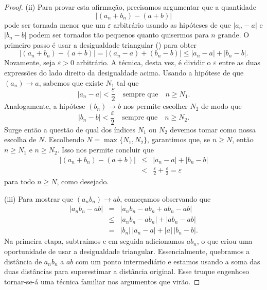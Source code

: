 \begin{proof}
(ii) Para provar esta afirmação, precisamos argumentar que a quantidade
\[
|(a_n + b_n) - (a + b)|
\]
pode ser tornada menor que um $\varepsilon$ arbitrário usando as hipóteses de que $|a_n - a|$ e $|b_n - b|$ podem ser tornados tão pequenos quanto quisermos para $n$ grande. O primeiro passo é usar a desigualdade triangular () para obter 
\[
|(a_n + b_n) - (a + b)| = |(a_n - a) + (b_n - b)| \leq |a_n - a| + |b_n - b|.
\]
Novamente, seja $\varepsilon > 0$ arbitrário. A técnica, desta vez, é dividir o $\varepsilon$ entre as duas expressões do lado direito da desigualdade acima. Usando a hipótese de que $(a_n) \to a$, sabemos que existe $N_1$ tal que
\[
|a_n - a| < \frac{\varepsilon}{2} \quad \text{sempre que} \quad n \geq N_1.
\]
Analogamente, a hipótese $(b_n) \to b$ nos permite escolher $N_2$ de modo que
\[
|b_n - b| < \frac{\varepsilon}{2} \quad \text{sempre que} \quad n \geq N_2.
\]
Surge então a questão de qual dos índices $N_1$ ou $N_2$ devemos tomar como nossa escolha de $N$. Escolhendo $N = \max\{N_1, N_2\}$, garantimos que, se $n \geq N$, então $n \geq N_1$ e $n \geq N_2$. Isso nos permite concluir que
\[
\begin{array}{rcl}
|(a_n + b_n) - (a + b)|
& \leq & |a_n - a| + |b_n - b| \\[2pt]
& < & \displaystyle\frac{\varepsilon}{2} + \frac{\varepsilon}{2} = \varepsilon
\end{array}
\]
para todo $n \geq N$, como desejado.

(iii) Para mostrar que $(a_n b_n) \to ab$, começamos observando que
\[
\begin{array}{rcl}
|a_n b_n - ab|
& = & |a_n b_n - ab_n + ab_n - ab| \\[2pt]
& \leq & |a_n b_n - ab_n| + |ab_n - ab| \\[2pt]
& = & |b_n|\, |a_n - a| + |a|\, |b_n - b|.
\end{array}
\]
Na primeira etapa, subtraímos e em seguida adicionamos $ab_n$, o que criou uma oportunidade de usar a desigualdade triangular. Essencialmente, quebramos a distância de $a_n b_n$ a $ab$ com um ponto intermediário e estamos usando a soma das duas distâncias para superestimar a distância original. Esse truque engenhoso tornar-se-á uma técnica familiar nos argumentos que virão. 


\end{proof}
